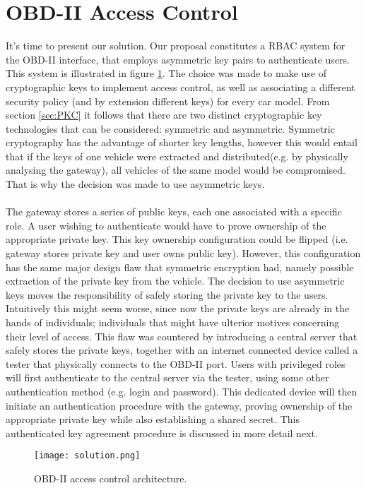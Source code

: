 \section{OBD-II Access Control}
\label{sec:obd2_access_control}

It's time to present our solution. Our proposal constitutes a RBAC system for the OBD-II interface, that employs asymmetric key pairs to authenticate users. This system is illustrated in figure \ref{fig:solution}. The choice was made to make use of cryptographic keys to implement access control, as well as associating a different security policy (and by extension different keys) for every car model. From section \ref{sec:PKC} it follows that there are two distinct cryptographic key technologies that can be considered: symmetric and asymmetric. Symmetric cryptography has the advantage of shorter key lengths, however this would entail that if the keys of one vehicle were extracted and distributed(e.g. by physically analysing the gateway), all vehicles of the same model would be compromised. That is why the decision was made to use asymmetric keys. \\ \\ The gateway stores a series of public keys, each one associated with a specific role. A user wishing to authenticate would have to prove ownership of the appropriate private key. This key ownership configuration could be flipped (i.e. gateway stores private key and user owns public key). However, this configuration has the same major design flaw that symmetric encryption had, namely possible extraction of the private key from the vehicle. The decision to use asymmetric keys moves the responsibility of safely storing the private key to the users. Intuitively this might seem worse, since now the private keys are already in the hands of individuals; individuals that might have ulterior motives concerning their level of access. This flaw was countered by introducing a central server that safely stores the private keys, together with an internet connected device called a tester that physically connects to the OBD-II port. Users with privileged roles will first authenticate to the central server via the tester, using some other authentication method (e.g. login and password). This dedicated device will then initiate an authentication procedure with the gateway, proving ownership of the appropriate private key while also establishing a shared secret. This authenticated key agreement procedure is discussed in more detail next.

\begin{figure}[h]
	\label{fig:solution}
	\centering
	\texttt{[image: solution.png]}
	\caption{OBD-II access control architecture.}
\end{figure}


